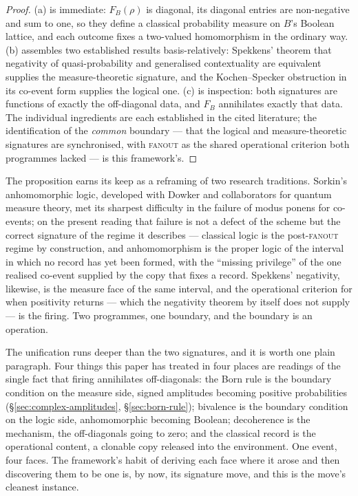 \begin{proof}
(a) is immediate: $F_B(\rho)$ is diagonal, its diagonal entries are non-negative and sum to one, so
they define a classical probability measure on $B$'s Boolean lattice, and each outcome fixes a
two-valued homomorphism in the ordinary way. (b) assembles two established results basis-relatively:
Spekkens' theorem that negativity of quasi-probability and generalised contextuality are equivalent
\autocite{spekkens2008negativity} supplies the measure-theoretic signature, and the Kochen--Specker
obstruction in its co-event form \autocite{sorkin2007anhomomorphic, dowkerghazitabatabai2008}
supplies the logical one. (c) is inspection: both signatures are functions of exactly the
off-diagonal data, and $F_B$ annihilates exactly that data. The individual ingredients are each
established in the cited literature; the identification of the \emph{common} boundary --- that the
logical and measure-theoretic signatures are synchronised, with \textsc{fanout} as the shared
operational criterion both programmes lacked --- is this framework's.
\end{proof}

The proposition earns its keep as a reframing of two research traditions. Sorkin's anhomomorphic
logic, developed with Dowker and collaborators for quantum measure theory, met its sharpest
difficulty in the failure of modus ponens for co-events; on the present reading that failure is not
a defect of the scheme but the correct signature of the regime it describes --- classical logic is
the post-\textsc{fanout} regime by construction, and anhomomorphism is the proper logic of the
interval in which no record has yet been formed, with the ``missing privilege'' of the one realised
co-event supplied by the copy that fixes a record. Spekkens' negativity, likewise, is the measure
face of the same interval, and the operational criterion for when positivity returns --- which the
negativity theorem by itself does not supply --- is the firing. Two programmes, one boundary,
and the boundary is an operation.

The unification runs deeper than the two signatures, and it is worth one plain paragraph. Four
things this paper has treated in four places are readings of the single fact that firing
annihilates off-diagonals: the Born rule is the boundary condition on the measure side, signed
amplitudes becoming positive probabilities (\S\ref{sec:complex-amplitudes},
\S\ref{sec:born-rule}); bivalence is the boundary condition on the logic side, anhomomorphic
becoming Boolean; decoherence is the mechanism, the off-diagonals going to zero; and the classical
record is the operational content, a clonable copy released into the environment. One event, four
faces. The framework's habit of deriving each face where it arose and then discovering them to be
one is, by now, its signature move, and this is the move's cleanest instance.

